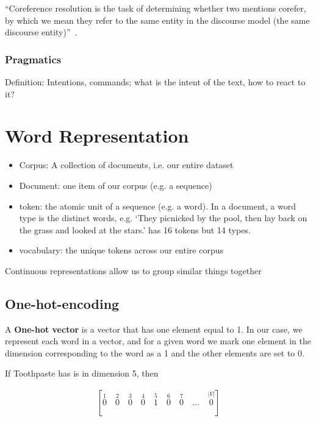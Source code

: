 \documentclass[11pt]{article}
\begin{document}
``Coreference resolution is the task of determining whether two mentions corefer, by which we mean they refer to the same entity in the discourse model (the same discourse entity)''~\cite{book-speech-and-language-processing}.

\subsubsection{Pragmatics}

Definition: Intentions, commands; what is the intent of the text, how to react to it?

\section{Word Representation}

\begin{itemize}
    \item Corpus: A collection of documents, i.e. our entire dataset
    \item Document: one item of our corpus (e.g. a sequence)
    \item token: the atomic unit of a sequence (e.g. a word). In a document, a word type is the distinct words, e.g. `They picnicked by the pool, then lay back on the grass and looked at the stars.' has 16 tokens but 14 types.
    \item vocabulary: the unique tokens across our entire corpus
\end{itemize}

Continuous representations allow us to group similar things together

\subsection{One-hot-encoding}

A \textbf{One-hot vector} is a vector that has one element equal to 1. In our case, we represent each word in a vector, and for a given word we mark one element in the dimension corresponding to the word as a 1 and the other elements are set to 0.

If Toothpaste has is in dimension 5, then

\begin{align*}
    \left[\stackrel{1}{0} \quad \stackrel{2}{0} \quad \stackrel{3}{0} \quad \stackrel{4}{0} \quad \stackrel{5}{1} \quad \stackrel{6}{0} \quad \stackrel{7}{0} \quad \ldots \quad \stackrel{|V|}{0}  \right]
\end{align*}
\end{document}

